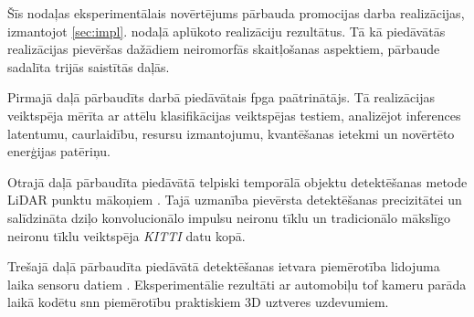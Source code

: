 Šīs nodaļas eksperimentālais novērtējums pārbauda promocijas darba realizācijas, izmantojot \ref{sec:impl}. nodaļā aplūkoto
realizāciju rezultātus. Tā kā piedāvātās realizācijas pievēršas dažādiem neiromorfās skaitļošanas aspektiem, pārbaude
sadalīta trijās saistītās daļās.

Pirmajā daļā pārbaudīts darbā \cite{lielamurs2026} piedāvātais \Gls{fpga} paātrinātājs. Tā realizācijas veiktspēja mērīta ar
attēlu klasifikācijas veiktspējas testiem, analizējot inferences latentumu, caurlaidību, resursu izmantojumu, kvantēšanas ietekmi
un novērtēto enerģijas patēriņu.

Otrajā daļā pārbaudīta piedāvātā telpiski temporālā objektu detektēšanas metode LiDAR punktu mākoņiem \cite{lielamurs2024}. Tajā uzmanība pievērsta detektēšanas precizitātei un salīdzināta dziļo konvolucionālo impulsu neironu tīklu un tradicionālo mākslīgo neironu tīklu veiktspēja \textit{KITTI} datu kopā.

Trešajā daļā pārbaudīta piedāvātā detektēšanas ietvara piemērotība lidojuma laika sensoru datiem \cite{lielamurs2025}. Eksperimentālie rezultāti ar automobiļu \Gls{tof} kameru parāda laikā kodētu \Gls{snn} piemērotību praktiskiem 3D uztveres uzdevumiem.
